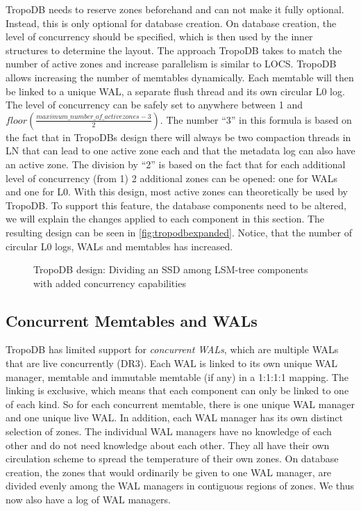TropoDB needs to reserve zones beforehand and can not make it fully optional. Instead, this is only optional for database creation. On database creation, the level of concurrency should be specified, which is then used by the inner structures to determine the layout. The approach TropoDB takes to match the number of active zones and increase parallelism is similar to LOCS. TropoDB allows increasing the number of memtables dynamically. Each memtable will then be linked to a unique WAL, a separate flush thread and its own circular L0 log. The level of concurrency can be safely set to anywhere between 1 and $floor(\frac{maximum\_number\_of\_activezones - 3}{2})$. The number ``3'' in this formula is based on the fact that in TropoDBs design there will always be two compaction threads in LN that can lead to one active zone each and that the metadata log can also have an active zone. The division by ``2'' is based on the fact that for each additional level of concurrency (from 1) 2 additional zones can be opened: one for WALs and one for L0. With this design, most active zones can theoretically be used by TropoDB. To support this feature, the database components need to be altered, we will explain the changes applied to each component in this section. The resulting design can be seen in \autoref{fig:tropodbexpanded}. Notice, that the number of circular L0 logs, WALs and memtables has increased.
 
\begin{figure}[h]
\centering
\begin{minipage}{0.85\textwidth}
  \centering
  
\end{minipage}%
\caption{ TropoDB design: Dividing an SSD among LSM-tree components with added concurrency capabilities }
\label{fig:tropodbexpanded}
\end{figure}
 
 \subsection{Concurrent Memtables and WALs}
TropoDB has limited support for \textit{concurrent WALs}, which are multiple WALs that are live concurrently  (DR3). Each WAL is linked to its own unique WAL manager, memtable and immutable memtable (if any) in a 1:1:1:1 mapping. The linking is exclusive, which means that each component can only be linked to one of each kind. So for each concurrent memtable, there is one unique WAL manager and one unique live WAL. In addition, each WAL manager has its own distinct selection of zones. The individual WAL managers have no knowledge of each other and do not need knowledge about each other. They all have their own circulation scheme to spread the temperature of their own zones. On database creation, the zones that would ordinarily be given to one WAL manager, are divided evenly among the WAL managers in contiguous regions of zones. We thus now also have a log of WAL managers. 

